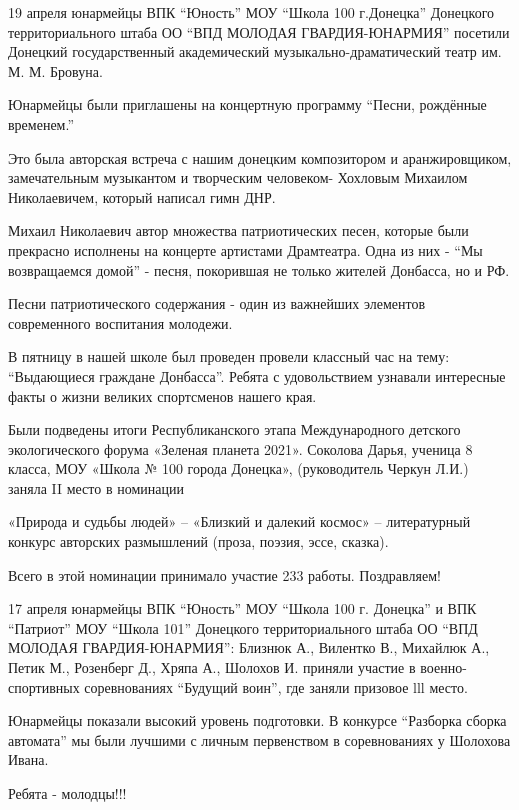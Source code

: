 
19 апреля юнармейцы ВПК \enquote{Юность} МОУ \enquote{Школа 100 г.Донецка}
Донецкого территориального штаба ОО \enquote{ВПД МОЛОДАЯ ГВАРДИЯ-ЮНАРМИЯ}
посетили Донецкий государственный академический музыкально-драматический театр
им. М. М. Бровуна.


Юнармейцы были приглашены на концертную программу \enquote{Песни, рождённые
временем.}

Это была авторская встреча с нашим донецким композитором и аранжировщиком,
замечательным музыкантом и творческим человеком- Хохловым Михаилом
Николаевичем, который написал гимн ДНР.

Михаил Николаевич автор множества патриотических песен, которые были прекрасно
исполнены на концерте артистами Драмтеатра. Одна из них - \enquote{Мы
возвращаемся домой} - песня, покорившая не только жителей Донбасса, но и РФ.

Песни патриотического содержания - один из важнейших элементов современного
воспитания молодежи.


В пятницу в нашей школе был проведен провели классный час на тему: \enquote{Выдающиеся
граждане Донбасса}. Ребята с удовольствием узнавали интересные факты о жизни
великих спортсменов нашего края.



Были подведены итоги Республиканского этапа Международного детского
экологического форума «Зеленая планета 2021». Соколова Дарья, ученица 8 класса,
МОУ «Школа № 100 города Донецка», (руководитель Черкун Л.И.) заняла II место в
номинации 

«Природа и судьбы людей» – «Близкий и далекий космос» – литературный конкурс
авторских размышлений (проза, поэзия, эссе, сказка).

Всего в этой номинации принимало участие 233 работы. Поздравляем!


17 апреля юнармейцы ВПК \enquote{Юность} МОУ \enquote{Школа 100 г. Донецка} и
ВПК \enquote{Патриот} МОУ \enquote{Школа 101} Донецкого территориального штаба
ОО \enquote{ВПД МОЛОДАЯ ГВАРДИЯ-ЮНАРМИЯ}: Близнюк А., Вилентко В., Михайлюк А.,
Петик М., Розенберг Д., Хряпа А., Шолохов И. приняли участие в
военно-спортивных соревнованиях \enquote{Будущий воин}, где заняли призовое lll
место.

Юнармейцы показали высокий уровень подготовки. В конкурсе \enquote{Разборка
сборка автомата} мы были лучшими с личным первенством в соревнованиях у
Шолохова Ивана. 

Ребята - молодцы!!!
